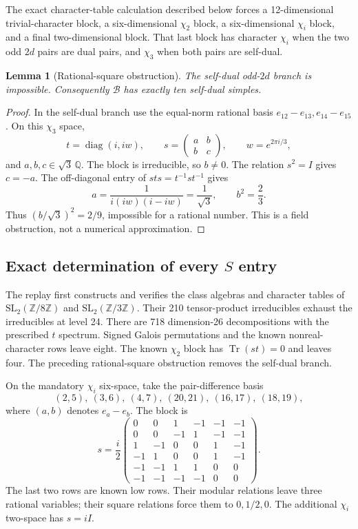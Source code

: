 \documentclass[11pt]{article}
\newtheorem{lemma}[theorem]{Lemma}
\begin{document}
The exact character-table calculation described below forces a
12-dimensional trivial-character block, a six-dimensional $\chi_2$
block, a six-dimensional $\chi_i$ block, and a final two-dimensional
block. That last block has character $\chi_i$ when the two odd
$2d$ pairs are dual pairs, and $\chi_3$ when both pairs are self-dual.

\begin{lemma}[Rational-square obstruction]
The self-dual odd-$2d$ branch is impossible. Consequently $\mathcal B$
has exactly ten self-dual simples.
\end{lemma}
\begin{proof}
In the self-dual branch use the equal-norm rational basis
$e_{12}-e_{13},e_{14}-e_{15}$. On this $\chi_3$ space,
\[
 t=\operatorname{diag}(i,iw),\qquad
 s=\begin{pmatrix}a&b\\b&c\end{pmatrix},\qquad w=e^{2\pi i/3},
\]
and $a,b,c\in\sqrt3\,\mathbb Q$. The block is irreducible, so
$b\ne0$. The relation $s^2=I$ gives $c=-a$.
The off-diagonal entry of $sts=t^{-1}st^{-1}$ gives
\[
 a=\frac{1}{i(iw)(i-iw)}=\frac1{\sqrt3},\qquad b^2=\frac23.
\]
Thus $(b/\sqrt3)^2=2/9$, impossible for a rational number.
This is a field obstruction, not a numerical approximation.
\end{proof}

\subsection{Exact determination of every $S$ entry}

The replay first constructs and verifies the class algebras and
character tables of $\mathrm{SL}_2(\mathbb Z/8\mathbb Z)$ and
$\mathrm{SL}_2(\mathbb Z/3\mathbb Z)$. Their 210 tensor-product
irreducibles exhaust the irreducibles at level 24. There are 718
dimension-26 decompositions with the prescribed $t$ spectrum. Signed
Galois permutations and the known nonreal-character rows leave eight.
The known $\chi_2$ block has $\operatorname{Tr}(st)=0$ and leaves four.
The preceding rational-square obstruction removes the self-dual
branch.

On the mandatory $\chi_i$ six-space, take the pair-difference basis
\[
(2,5),\ (3,6),\ (4,7),\ (20,21),\ (16,17),\ (18,19),
\]
where $(a,b)$ denotes $e_a-e_b$. The block is
\[
 s=\frac i2
 \begin{pmatrix}
0&0&1&-1&-1&-1\\0&0&-1&1&-1&-1\\
1&-1&0&0&1&-1\\-1&1&0&0&1&-1\\
-1&-1&1&1&0&0\\-1&-1&-1&-1&0&0
 \end{pmatrix}.
\]
The last two rows are known low rows. Their modular relations leave
three rational variables; their square relations force them to
$0,1/2,0$. The additional $\chi_i$ two-space has $s=iI$.
\end{document}
